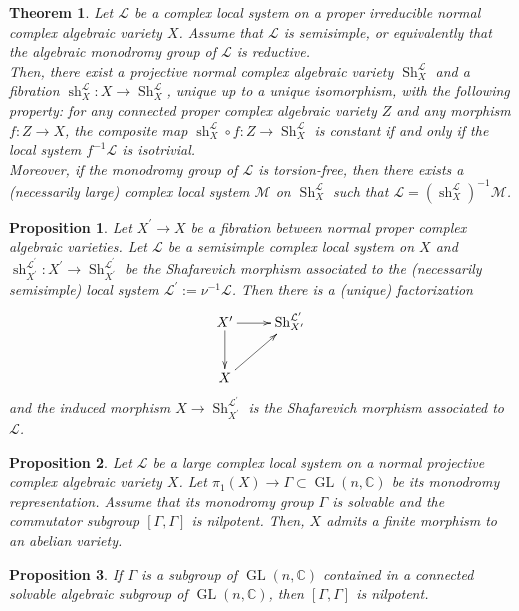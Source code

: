 \documentclass[10pt,a4paper]{amsart}
\newtheorem{thm}{Theorem}
\newtheorem{prop}{Proposition}
\DeclareMathOperator{\GL}{GL}
\DeclareMathOperator{\Sh}{Sh}
\def\bC{\mathbb{C}}
\def\cL{\mathcal{L}}
\def\cM{\mathcal{M}}
\DeclareMathOperator{\sh}{sh}
\begin{document}
\begin{thm}\label{existence of Shafarevich morphism}
Let $\cL$ be a complex local system on a proper irreducible normal complex algebraic variety $X$. Assume that $\cL$ is semisimple, or equivalently that the algebraic monodromy group of $\cL$ is reductive.\\
Then, there exist a projective normal complex algebraic variety $\Sh_X^\cL$ and a fibration $\sh_X^\cL \colon X \rightarrow \Sh_X^\cL$, unique up to a unique isomorphism, with the following property: for any connected proper complex algebraic variety $Z$ and any morphism $f \colon Z \rightarrow X$, the composite map $\sh_X^\cL \circ f \colon Z \rightarrow \Sh_X^\cL$ is constant if and only if the local system
$f^{-1} \cL$ is isotrivial. \\
Moreover, if the monodromy group of $\cL$ is torsion-free, then there exists a (necessarily large) complex local system $\cM$ on $\Sh_X^\cL$ such that $\cL = \left(\sh_X^\cL \right)^{-1} \cM$.
\end{thm}

\begin{prop}\label{Shafarevich: from smooth to normal}
Let $X^\prime \to X$ be a fibration between normal proper complex algebraic varieties. Let $\cL$ be a semisimple complex local system on $X$ and $\sh_{X^\prime}^{\cL^\prime} \colon X^\prime \rightarrow \Sh_{X^\prime}^{\cL^\prime}$ be the Shafarevich morphism associated to the (necessarily semisimple) local system $ \cL^\prime := \nu^{-1} \cL$. Then there is a (unique) factorization
\begin{align*}
\xymatrix{
X^\prime \ar[r] \ar[d] &  \Sh_{X^\prime}^{\cL^\prime} \\
X   \ar[ru]       &   }
\end{align*}
and the induced morphism $X \rightarrow \Sh_{X^\prime}^{\cL^\prime}$ is the Shafarevich morphism associated to $\cL$.
\end{prop}

\begin{prop}\label{Shafarevich in the solvable case}
Let $\cL$ be a large complex local system on a normal projective complex algebraic variety $X$. Let $\pi_1(X) \to \Gamma \subset \GL(n , \bC)$ be its monodromy representation. Assume that its monodromy group $\Gamma$ is solvable and the commutator subgroup $[\Gamma, \Gamma]$ is nilpotent. Then, $X$ admits a finite morphism to an abelian variety.
\end{prop}

\begin{prop}\label{criterion derived group nilpotent}
If $\Gamma$ is a subgroup of $ \GL(n , \bC)$ contained in a connected solvable algebraic subgroup of $ \GL(n , \bC)$, then
$[\Gamma, \Gamma]$ is nilpotent.
\end{prop}
\end{document}

